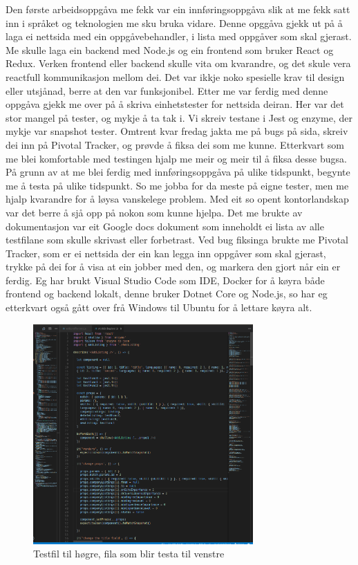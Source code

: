 \documentclass[12pt]{article}
\begin{document}
Den første arbeidsoppgåva me fekk var ein innføringsoppgåva slik at me fekk satt
inn i språket og teknologien me sku bruka vidare. Denne opggåva gjekk ut på å
laga ei nettsida med ein oppgåvebehandler, i lista med oppgåver som skal gjerast.
Me skulle laga ein backend med Node.js og ein frontend som bruker React og Redux.
Verken frontend eller backend skulle vita om kvarandre, og det skule vera reactfull
kommunikasjon mellom dei. Det var ikkje noko spesielle krav til design eller utsjånad,
berre at den var funksjonibel. Etter me var ferdig med denne oppgåva gjekk me
over på å skriva einhetstester for nettsida deiran. Her var det stor mangel på
tester, og mykje å ta tak i. Vi skreiv testane i Jest og enzyme, der mykje var
snapshot tester. Omtrent kvar fredag jakta me på bugs på sida, skreiv dei inn på
Pivotal Tracker, og prøvde å fiksa dei som me kunne. Etterkvart som me blei
komfortable med testingen hjalp me meir og meir til å fiksa desse bugsa.
På grunn av at me blei ferdig med innføringsoppgåva på ulike tidspunkt, begynte
me å testa på ulike tidspunkt. So me jobba for da meste på eigne tester, men me
hjalp kvarandre for å løysa vanskelege problem. Med eit so opent kontorlandskap
var det berre å sjå opp på nokon som kunne hjelpa. Det me brukte av dokumentasjon
var eit Google docs dokument som inneholdt ei lista av alle testfilane som skulle
skrivast eller forbetrast. Ved bug fiksinga brukte me Pivotal Tracker, som er ei
nettsida der ein kan legga inn oppgåver som skal gjerast, trykke på dei for å visa
at ein jobber med den, og markera den gjort når ein er ferdig. Eg har brukt
Visual Studio Code som IDE, Docker for å køyra både frontend og backend lokalt,
denne bruker Dotnet Core og Node.js, so har eg etterkvart også gått over frå
Windows til Ubuntu for å lettare køyra alt.

\begin{figure}[!h]
  \includegraphics[width=0.75\textwidth]{test}
  \centering
  \caption{Testfil til høgre, fila som blir testa til venstre}
  \label{fig:test1}
\end{figure}
\end{document}

